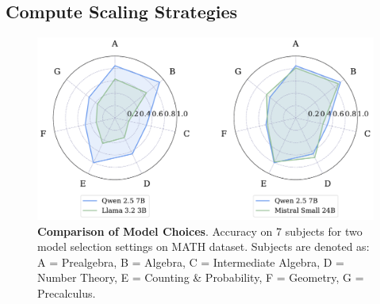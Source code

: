 \subsection{Compute Scaling Strategies}
\label{sec:scaling}


\begin{figure} 
\vspace{-20pt}
    \centering
    \includegraphics[width=\linewidth]{Figures/radar_compare_pairs.pdf}
    \vspace{-20pt}
    \caption{\textbf{Comparison of Model Choices}. Accuracy on 7 subjects for two model selection settings on MATH dataset. Subjects are denoted as: A = Prealgebra, B = Algebra, C = Intermediate Algebra, D = Number Theory, E = Counting \& Probability, F = Geometry, G = Precalculus.}

    \vspace{-10pt}
    \label{fig:motivation-search}
\end{figure}


